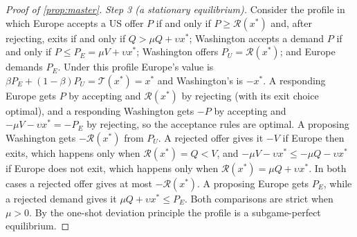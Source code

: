 \begin{proof}[Proof of \cref{prop:master}]
\emph{Step 3 (a stationary equilibrium).} Consider the profile in which Europe accepts a US offer $P$ if and only if $P\ge\mathcal R(x^*)$ and, after rejecting, exits if and only if $Q>\mu Q+\upsilon x^*$; Washington accepts a demand $P$ if and only if $P\le P_E=\mu V+\upsilon x^*$; Washington offers $P_U=\mathcal R(x^*)$; and Europe demands $P_E$. Under this profile Europe's value is $\beta P_E+(1-\beta)P_U=\mathcal T(x^*)=x^*$ and Washington's is $-x^*$. A responding Europe gets $P$ by accepting and $\mathcal R(x^*)$ by rejecting (with its exit choice optimal), and a responding Washington gets $-P$ by accepting and $-\mu V-\upsilon x^*=-P_E$ by rejecting, so the acceptance rules are optimal. A proposing Washington gets $-\mathcal R(x^*)$ from $P_U$. A rejected offer gives it $-V$ if Europe then exits, which happens only when $\mathcal R(x^*)=Q<V$, and $-\mu V-\upsilon x^*\le-\mu Q-\upsilon x^*$ if Europe does not exit, which happens only when $\mathcal R(x^*)=\mu Q+\upsilon x^*$. In both cases a rejected offer gives at most $-\mathcal R(x^*)$. A proposing Europe gets $P_E$, while a rejected demand gives it $\mu Q+\upsilon x^*\le P_E$. Both comparisons are strict when $\mu>0$. By the one-shot deviation principle the profile is a subgame-perfect equilibrium.


\end{proof}
